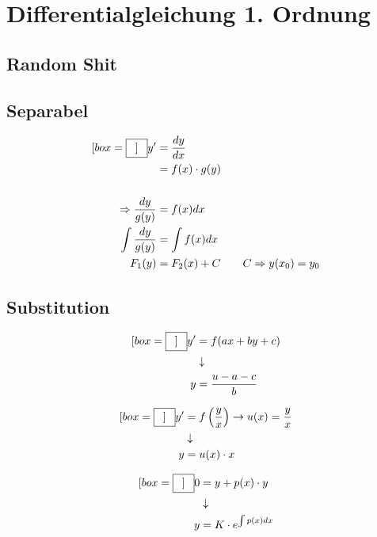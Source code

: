 \documentclass[a4paper]{fhnwreport} %
\newcommand*{\widebox}[2][0.5em]{\fbox{\hspace{#1}$\displaystyle #2$\hspace{#1}}}
\begin{document}
%
%

\section{Differentialgleichung 1. Ordnung}

\subsection{Random Shit}


\subsection{Separabel}
\begin{align*}[box=\widebox]
y' &= \frac{d y}{d x} \\
&= f(x)\cdot g(y)\\\\
\Rightarrow \frac{d y}{g(y)} &= f(x)d x\\
\int{\frac{d y}{g(y)}} &= \int{f(x)d x}\\
F_{1}(y) &= F_{2}(x)+C \qquad C\Rightarrow y(x_{0}) = y_{0}
\end{align*}

\subsection{Substitution}

\begin{center}
\begin{align*}[box=\widebox]
y' &= f(ax+by+c) \\
&\downarrow \\
y &= \frac{u-a-c}{b}
\end{align*}
\end{center}

\begin{center}
\begin{align*}[box=\widebox]
y' &= f\left(\frac{y}{x}\right) \rightarrow u(x)=\frac{y}{x}\\
&\downarrow \\
y &= u(x)\cdot x
\end{align*}
\end{center}

\begin{center}
\begin{align*}[box=\widebox]
0 &= y + p(x)\cdot y \\
&\downarrow \\
y &= K\cdot e^{\int p(x)dx}
\end{align*}
\end{center}
\end{document}
